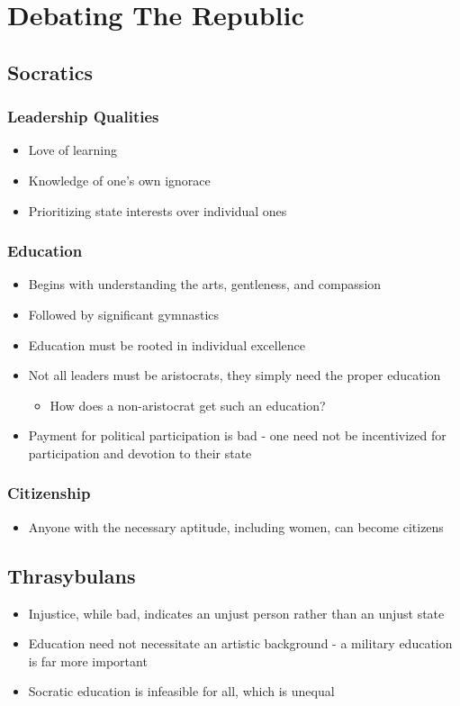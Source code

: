 \documentclass[11pt]{article}
\author{Sudhan Chitgopkar}
\date{\today}
\title{}
\begin{document}
\tableofcontents

\section{Debating The Republic}
\label{sec:orge5d37e9}
\subsection{Socratics}
\label{sec:org2be54f0}
\subsubsection{Leadership Qualities}
\label{sec:org48ea492}
\begin{itemize}
\item Love of learning
\item Knowledge of one's own ignorace
\item Prioritizing state interests over individual ones
\end{itemize}
\subsubsection{Education}
\label{sec:orgc6f8688}
\begin{itemize}
\item Begins with understanding the arts, gentleness, and compassion
\item Followed by significant gymnastics
\item Education must be rooted in individual excellence
\item Not all leaders must be aristocrats, they simply need the proper education
\begin{itemize}
\item How does a non-aristocrat get such an education?
\end{itemize}
\item Payment for political participation is bad - one need not be incentivized for
participation and devotion to their state
\end{itemize}
\subsubsection{Citizenship}
\label{sec:org43451df}
\begin{itemize}
\item Anyone with the necessary aptitude, including women, can become citizens
\end{itemize}
\subsection{Thrasybulans}
\label{sec:org43c36e6}
\begin{itemize}
\item Injustice, while bad, indicates an unjust person rather than an unjust state
\item Education need not necessitate an artistic background - a military education is far more important
\item Socratic education is infeasible for all, which is unequal
\end{itemize}
\end{document}
